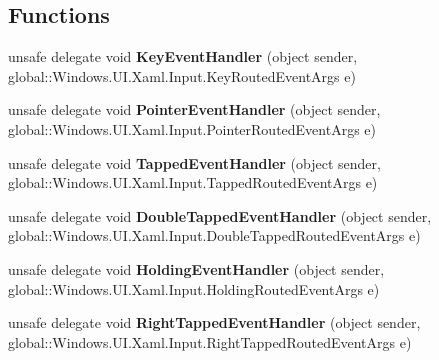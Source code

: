 \subsection*{Functions}
\begin{DoxyCompactItemize}
\item 
\mbox{\label{namespace_windows_1_1_u_i_1_1_xaml_1_1_input_a558329223f75f98756fe04ba9e075af8}} 
unsafe delegate void {\bfseries Key\+Event\+Handler} (object sender, global\+::\+Windows.\+U\+I.\+Xaml.\+Input.\+Key\+Routed\+Event\+Args e)
\item 
\mbox{\label{namespace_windows_1_1_u_i_1_1_xaml_1_1_input_a106e557e5473c19acb9d3cec6d845273}} 
unsafe delegate void {\bfseries Pointer\+Event\+Handler} (object sender, global\+::\+Windows.\+U\+I.\+Xaml.\+Input.\+Pointer\+Routed\+Event\+Args e)
\item 
\mbox{\label{namespace_windows_1_1_u_i_1_1_xaml_1_1_input_a3d8f0f2e817305df6aa62b1ce40623d5}} 
unsafe delegate void {\bfseries Tapped\+Event\+Handler} (object sender, global\+::\+Windows.\+U\+I.\+Xaml.\+Input.\+Tapped\+Routed\+Event\+Args e)
\item 
\mbox{\label{namespace_windows_1_1_u_i_1_1_xaml_1_1_input_a69ce6f43fea0965bbd0f775a434858b8}} 
unsafe delegate void {\bfseries Double\+Tapped\+Event\+Handler} (object sender, global\+::\+Windows.\+U\+I.\+Xaml.\+Input.\+Double\+Tapped\+Routed\+Event\+Args e)
\item 
\mbox{\label{namespace_windows_1_1_u_i_1_1_xaml_1_1_input_a36f485fe89e9a0a73c3b21e44b9c0903}} 
unsafe delegate void {\bfseries Holding\+Event\+Handler} (object sender, global\+::\+Windows.\+U\+I.\+Xaml.\+Input.\+Holding\+Routed\+Event\+Args e)
\item 
\mbox{\label{namespace_windows_1_1_u_i_1_1_xaml_1_1_input_a79b130d170441ab9f77bcb356cad9292}} 
unsafe delegate void {\bfseries Right\+Tapped\+Event\+Handler} (object sender, global\+::\+Windows.\+U\+I.\+Xaml.\+Input.\+Right\+Tapped\+Routed\+Event\+Args e)
\item 

\end{DoxyCompactItemize}
